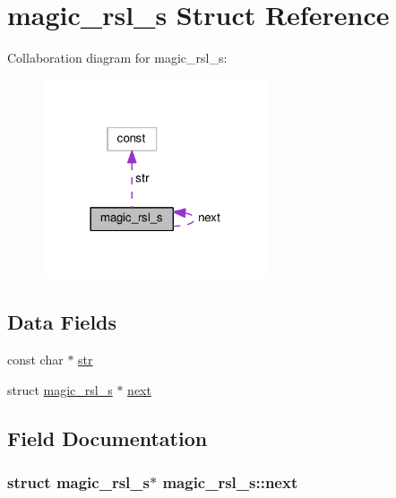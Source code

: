 \hypertarget{structmagic__rsl__s}{}\section{magic\+\_\+rsl\+\_\+s Struct Reference}
\label{structmagic__rsl__s}


Collaboration diagram for magic\+\_\+rsl\+\_\+s\+:
\nopagebreak
\begin{figure}[H]
\begin{center}
\leavevmode
\includegraphics[width=189pt]{structmagic__rsl__s__coll__graph}
\end{center}
\end{figure}
\subsection*{Data Fields}
\begin{DoxyCompactItemize}
\item 
const char $\ast$ \hyperlink{structmagic__rsl__s_a6e9fe6efeb440e5b4ad81b36a2bf232d}{str}
\item 
struct \hyperlink{structmagic__rsl__s}{magic\+\_\+rsl\+\_\+s} $\ast$ \hyperlink{structmagic__rsl__s_a3e9f52d3189059a335b2dd22d370e08e}{next}
\end{DoxyCompactItemize}


\subsection{Field Documentation}
\subsubsection[{\texorpdfstring{next}{next}}]{\setlength{\rightskip}{0pt plus 5cm}struct {\bf magic\+\_\+rsl\+\_\+s}$\ast$ magic\+\_\+rsl\+\_\+s\+::next}\hypertarget{structmagic__rsl__s_a3e9f52d3189059a335b2dd22d370e08e}{}\label{structmagic__rsl__s_a3e9f52d3189059a335b2dd22d370e08e}
